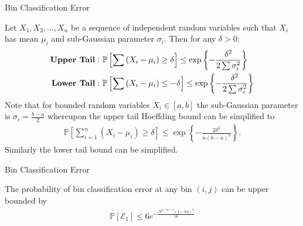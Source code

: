 \documentclass[10pt,xcolor=table]{beamer}
\newcommand{\mc}{\mathcal}
\newcommand{\mbb}{\mathbb}
\begin{document}
\begin{frame}{Bin Classification Error}

\begin{lemma}%
	\label{Lem:Chernoff}
	Let $X_1, X_2,\ldots, X_n$ be a sequence of independent random variables such that $X_i$ has mean $\mu_i$ and sub-Gaussian parameter $\sigma_i$. Then for any $\delta>0$:
	\begin{align*}
	\text{\textbf{Upper Tail}}: ~&\mbb{P}\left[\sum \left(X_i-\mu_i\right)\geq \delta\right]\leq \exp\left\lbrace-\frac{\delta^2}{2\sum \sigma_i^2}\right\rbrace\\
	\textbf{Lower Tail}: ~&\mbb{P}\left[\sum \left(X_i-\mu_i\right)\leq -\delta\right]\leq \exp\left\lbrace-\frac{\delta^2}{2\sum \sigma_i^2}\right\rbrace
	\end{align*}
	Note that for bounded random variables $X_i\in [a,b]$ the sub-Gaussian parameter is $\sigma_i=\frac{b-a}{2}$ whereupon the upper tail Hoeffding bound can be simplified to
	\begin{align*}
	\mbb{P}\left[\sum_{i=1}^{n} \left(X_i-\mu_i\right)\geq \delta\right]\leq \exp\left\lbrace-\frac{2\delta^2}{n(b-a)^2}\right\rbrace.
	\end{align*}
	Similarly the lower tail bound can be simplified.
\end{lemma}
\end{frame}




\begin{frame}{Bin Classification Error}
\begin{lemma}
	The probability of bin classification error at any bin $(i,j)$ can be upper bounded by
	\begin{align*}
	\mbb{P}[\mc{E}_1]\leq 6e^{-\frac{N^{\mu+\alpha-1}(1-6\eta)^2}{16}}
	\end{align*} 
\end{lemma}
\end{frame}




\end{document}
